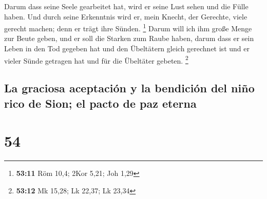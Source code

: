  Darum dass seine Seele gearbeitet hat, wird er seine
Lust sehen und die Fülle haben. Und durch seine Erkenntnis wird er, mein
Knecht, der Gerechte, viele gerecht machen; denn er trägt ihre Sünden.
\footnote{\textbf{53:11} Röm 10,4; 2Kor 5,21; Joh 1,29} 
Darum will ich ihm große Menge zur Beute geben, und er soll die Starken
zum Raube haben, darum dass er sein Leben in den Tod gegeben hat und den
Übeltätern gleich gerechnet ist und er vieler Sünde getragen hat und für
die Übeltäter gebeten. \footnote{\textbf{53:12} Mk 15,28; Lk 22,37; Lk
  23,34}

\hypertarget{la-graciosa-aceptaciuxf3n-y-la-bendiciuxf3n-del-niuxf1o-rico-de-sion-el-pacto-de-paz-eterna}{%
\subsection{La graciosa aceptación y la bendición del niño rico de Sion;
el pacto de paz
eterna}\label{la-graciosa-aceptaciuxf3n-y-la-bendiciuxf3n-del-niuxf1o-rico-de-sion-el-pacto-de-paz-eterna}}

\hypertarget{section-53}{%
\section{54}\label{section-53}}


